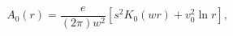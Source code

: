 \begin{equation}
A_{0}(r)=\frac{e}{(2\pi)w^{2}}\left[  s^{2}K_{0}\left(  wr\right)  +v_{0}%
^{2}\ln r\right]  , \label{Azero3}%
\end{equation}


